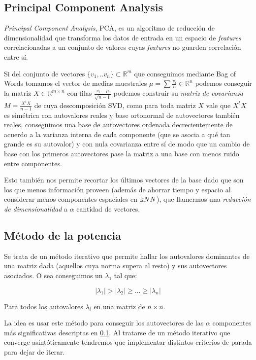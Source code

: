 
\subsection{Principal Component Analysis}%
\label{sub:principal_component_analysis}

\textit{Principal Component Analysis}, PCA, es un algoritmo de reducción de
dimensionalidad que transforma los datos de entrada en un espacio de
\textit{features} correlacionadas a un conjunto de valores cuyas
\textit{features} no guarden correlación entre sí.


Si del conjunto de vectores $\{v_1,..v_n \} \subset \mathds{R}^m$ que
conseguimos mediante Bag of Words tomamos el vector de medias muestrales
$\mu = \sum \frac{v_i}{n} \in \mathds{R}^n $ podemos conseguir la matriz
$X \in \mathds{R}^{m\times n}$
con filas $\frac{v_i-\mu}{\sqrt{n-1}}$
podemos construir su \textit{matriz de covarianza} $M=\frac{X^t X}{n-1}$
de cuya
descomposición SVD, como para toda matriz $X$ vale que $X^t X$ es simétrica
con autovalores reales y base ortonormal de autovectores también reales,
conseguimos una base de autovectores ordenada decrecientemente de acuerdo
a la varianza interna de cada componente (que se asocia a qué tan grande es su autovalor) y con nula covarianza entre
sí de modo que un cambio de base con los primeros autovectores pase la matriz a una base con menos ruido entre componentes.

Esto también nos permite recortar los últimos vectores de la base dado que son los que menos información proveen (además de ahorrar tiempo y espacio al considerar menos componentes espaciales en $\knn{}$), que llamermos una \textit{reducción de dimensionalidad} a $\alpha$ cantidad de vectores.

\subsection{Método de la potencia}%
\label{sub:pm}
Se trata de un método iterativo que permite hallar los autovalores dominantes de
una matriz dada (aquellos cuya norma supera al resto) y sus autovectores
asociados. O sea conseguimos un $\lambda_1$ tal que:

$$ |\lambda_1| > |\lambda_2| \geq ... \geq |\lambda_n| $$

Para todos los autovalores $\lambda_i$ en una matriz de $n\times n$.

La idea es usar este método para conseguir los autovectores de las $\alpha$
componentes más significativas descriptas en \ref{sub:principal_component_analysis}. Al tratarse
de un método iterativo que converge asintóticamente tendremos que implementar distintos criterios de parada para dejar de iterar.
